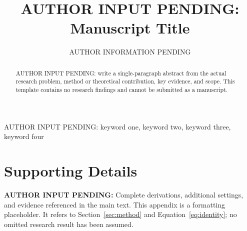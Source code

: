 \documentclass[lettersize,journal]{IEEEtran}
\title{AUTHOR INPUT PENDING: Manuscript Title}\author{AUTHOR INFORMATION PENDING}
\newcommand{\AuthorPending}[1]{\textbf{AUTHOR INPUT PENDING:} #1}
\begin{document}
\maketitle
\begin{abstract}
AUTHOR INPUT PENDING: write a single-paragraph abstract from the actual research problem,
method or theoretical contribution, key evidence, and scope. This template contains
no research findings and cannot be submitted as a manuscript.
\end{abstract}
\begin{IEEEkeywords}AUTHOR INPUT PENDING: keyword one, keyword two, keyword three, keyword four\end{IEEEkeywords}


\appendix
\section{Supporting Details}
\label{app:supporting}
\AuthorPending{Complete derivations, additional settings, and evidence referenced in the main text.}
This appendix is a formatting placeholder. It refers to Section~\ref{sec:method} and
Equation~\ref{eq:identity}; no omitted research result has been assumed.
\end{document}
